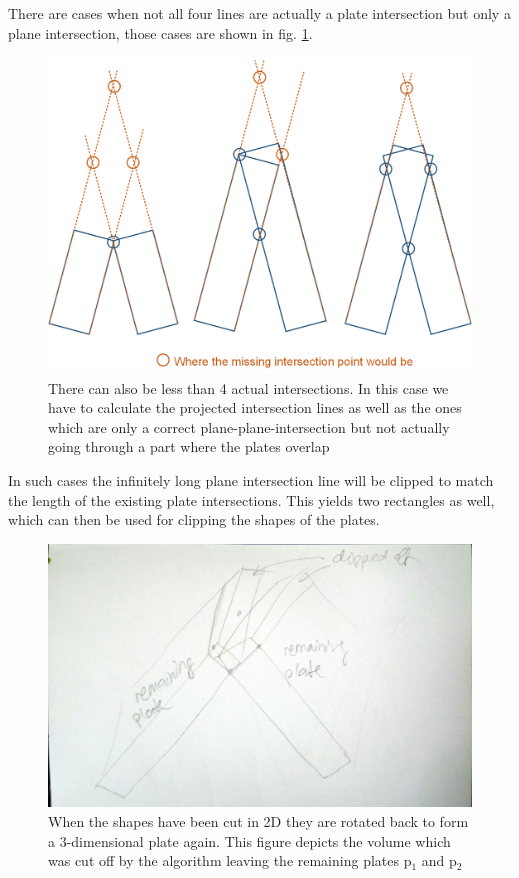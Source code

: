 \documentclass[../ClassicThesis.tex]{subfiles}
\begin{document}
There are cases when not all four lines are actually a plate intersection but only a plane intersection, those cases are shown in fig. \ref{fig:casesOfLines}. 
\begin{figure}[!ht]
\centering
\includegraphics[width=\columnwidth]{Images/10-joints-casesOfLines.png}
\caption{There can also be less than 4 actual intersections. In this case we have to calculate the projected intersection lines as well as the ones which are only a correct plane-plane-intersection but not actually going through a part where the plates overlap}
\label{fig:casesOfLines}
\end{figure}

In such cases the infinitely long plane intersection line will be clipped to match the length of the existing plate intersections. This yields two rectangles as well, which can then be used for clipping the shapes of the plates.

\begin{figure}[!ht]
\centering
\includegraphics[width=.5\columnwidth, angle = 90]{Images/06-1-graph-clippingResult.jpg}
\caption{When the shapes have been cut in 2D they are rotated back to form a 3-dimensional plate again. This figure depicts the volume which was cut off by the algorithm leaving the remaining plates p$_1$ and p$_2$}
\label{fig:3dPlaneClipping}
\end{figure}
\end{document}
